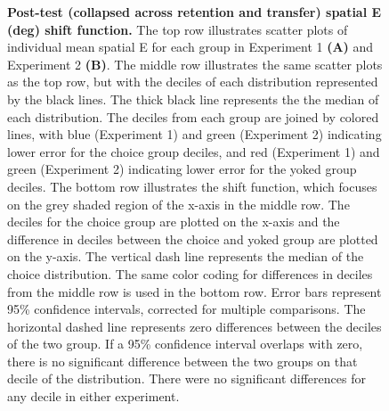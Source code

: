 \documentclass[
  doc, donotrepeattitle,floatsintext]{apa7}
\begin{document}
\begin{figure}
\caption{\small \onehalfspacing \textbf{Post-test (collapsed across retention and transfer) spatial E (deg) shift function.} The top row illustrates scatter plots of individual mean spatial E for each group in Experiment 1 \textbf{(A)} and Experiment 2 \textbf{(B)}. The middle row illustrates the same scatter plots as the top row, but with the deciles of each distribution represented by the black lines. The thick black line represents the the median of each distribution. The deciles from each group are joined by colored lines, with blue (Experiment 1) and green (Experiment 2) indicating lower error for the choice group deciles, and red (Experiment 1) and green (Experiment 2) indicating lower error for the yoked group deciles. The bottom row illustrates the shift function, which focuses on the grey shaded region of the x-axis in the middle row. The deciles for the choice group are plotted on the x-axis and the difference in deciles between the choice and yoked group are plotted on the y-axis. The vertical dash line represents the median of the choice distribution. The same color coding for differences in deciles from the middle row is used in the bottom row. Error bars represent 95\% confidence intervals, corrected for multiple comparisons. The horizontal dashed line represents zero differences between the deciles of the two group. If a 95\% confidence interval overlaps with zero, there is no significant difference between the two groups on that decile of the distribution. There were no significant differences for any decile in either experiment.}\label{fig:figS3}
\end{figure}
\end{document}
